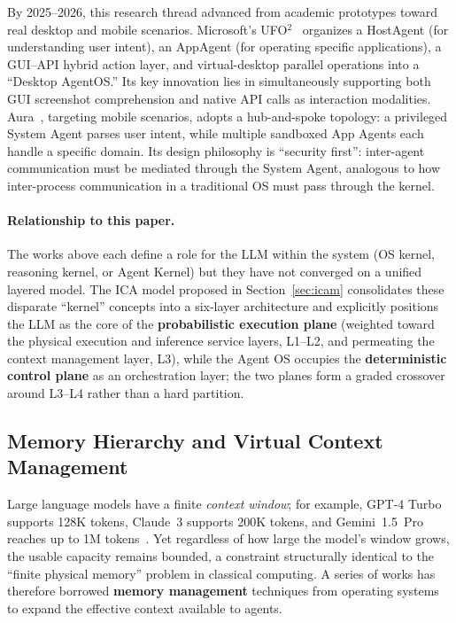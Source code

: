 By 2025--2026, this research thread advanced from academic prototypes toward real desktop and mobile scenarios.
Microsoft's UFO$^2$~\cite{ufo2_2025} organizes a HostAgent (for understanding user intent), an AppAgent (for operating specific applications), a GUI--API hybrid action layer, and virtual-desktop parallel operations into a ``Desktop AgentOS.''
Its key innovation lies in simultaneously supporting both GUI screenshot comprehension and native API calls as interaction modalities.
Aura~\cite{aura2025}, targeting mobile scenarios, adopts a hub-and-spoke topology: a privileged System Agent parses user intent, while multiple sandboxed App Agents each handle a specific domain.
Its design philosophy is ``security first'': inter-agent communication must be mediated through the System Agent, analogous to how inter-process communication in a traditional OS must pass through the kernel.

\paragraph{Relationship to this paper.}
The works above each define a role for the LLM within the system (OS kernel, reasoning kernel, or Agent Kernel) but they have not converged on a unified layered model.
The ICA model proposed in Section~\ref{sec:icam} consolidates these disparate ``kernel'' concepts into a six-layer architecture and explicitly positions the LLM as the core of the \textbf{probabilistic execution plane} (weighted toward the physical execution and inference service layers, L1--L2, and permeating the context management layer, L3), while the Agent OS occupies the \textbf{deterministic control plane} as an orchestration layer; the two planes form a graded crossover around L3--L4 rather than a hard partition.

\subsection{Memory Hierarchy and Virtual Context Management}
\label{sec:related-memory}

Large language models have a finite \textit{context window}; for example, GPT-4 Turbo supports 128K tokens, Claude~3 supports 200K tokens, and Gemini~1.5~Pro reaches up to 1M tokens~\cite{gemini2024}.
Yet regardless of how large the model's window grows, the usable capacity remains bounded, a constraint structurally identical to the ``finite physical memory'' problem in classical computing.
A series of works has therefore borrowed \textbf{memory management} techniques from operating systems to expand the effective context available to agents.

